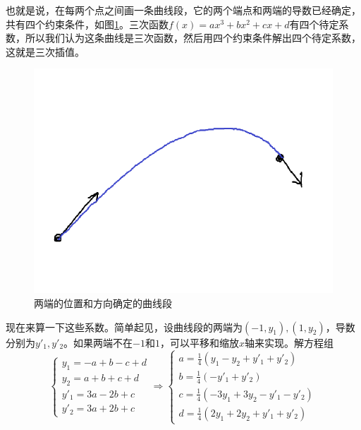 也就是说，在每两个点之间画一条曲线段，它的两个端点和两端的导数已经确定，共有四个约束条件，如图\ref{fig-cubic-interpo}。三次函数$f(x)=a x^3+b x^2+c x+d$有四个待定系数，所以我们认为这条曲线是三次函数，然后用四个约束条件解出四个待定系数，这就是三次插值。
\begin{figure}[htb]
\centering
\includegraphics[scale=0.5]{fig/cubic-interpo}
\caption{两端的位置和方向确定的曲线段}
\label{fig-cubic-interpo}
\end{figure}

现在来算一下这些系数。简单起见，设曲线段的两端为$(-1,y_1),(1,y_2)$，导数分别为$y'_1,y'_2$。如果两端不在$-1$和$1$，可以平移和缩放$x$轴来实现。解方程组
\begin{equation*}
\begin{cases}
y_1=-a+b-c+d \\
y_2=a+b+c+d \\
y'_1=3 a-2 b+c \\
y'_2=3 a+2 b+c
\end{cases} \Rightarrow \begin{cases}
a=\frac{1}{4}(y_1-y_2+y'_1+y'_2) \\
b=\frac{1}{4}(-y'_1+y'_2) \\
c=\frac{1}{4}(-3 y_1+3 y_2-y'_1-y'_2) \\
d=\frac{1}{4}(2y_1+2y_2+y'_1+y'_2)
\end{cases}
\end{equation*}

